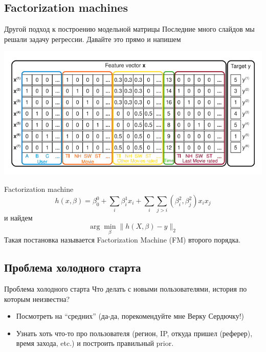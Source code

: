 \documentclass[14pt, fleqn, xcolor={dvipsnames, table}]{beamer}
\begin{document}
\subsection{Factorization machines} %

\begin{frame}{Другой подход к построению модельной матрицы}
Последние много слайдов мы решали задачу регрессии. Давайте это прямо и напишем
\begin{center}
\includegraphics[width=1\textwidth]{FMSetup.png}
\end{center}
\end{frame}

\begin{frame}{Factorization machine}
\small
$$
h(x, \beta) = \beta_0^0 + \sum_i \beta_i^1 x_i + \sum_i \sum_{j > i} (\beta_i^2, \beta_j^2)x_i x_j
$$
и найдем
$$
\arg \min_\beta \|h(X, \beta) - y\|_2
$$
Такая постановка называется Factorization Machine (FM) второго порядка.
\end{frame}

\subsection{Проблема холодного старта}
\begin{frame}{Проблема холодного старта}
Что делать с новыми пользователями, история по которым неизвестна?
\begin{itemize}
  \item Посмотреть на ``средних'' (да-да, порекомендуйте мне Верку Сердючку!)
  \item Узнать хоть что-то про пользователя (регион, IP, откуда пришел (реферер), время захода, etc.) и построить правильный prior.
\end{itemize}
\end{frame}
\end{document}

